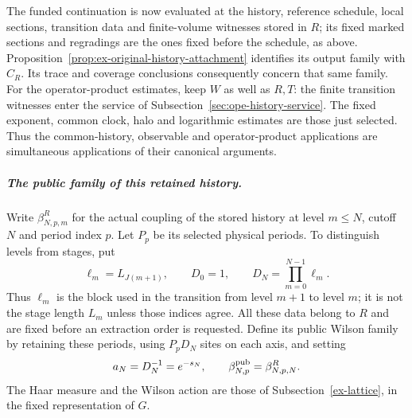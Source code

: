 The funded continuation is now evaluated at the history, reference
schedule, local sections, transition data and finite-volume witnesses
stored in $R$; its fixed marked sections and regradings are the ones fixed
before the schedule, as above. Proposition~\ref{prop:ex-original-history-attachment}
identifies its output family with $C_R$. Its trace and coverage
conclusions consequently concern that same family. For the
operator-product estimates, keep $W$ as well as $R,T$: the finite
transition witnesses enter the service of
Subsection~\ref{sec:ope-history-service}. The fixed exponent, common
clock, halo and logarithmic estimates are those just selected.
Thus the common-history, observable and operator-product applications
are simultaneous applications of their canonical arguments.

\subparagraph{The public family of this retained history.}
Write $\beta^R_{N,p,m}$ for the actual coupling of the stored history at
level $m\le N$, cutoff $N$ and period index $p$. Let $P_p$ be its selected
physical periods. To distinguish levels from stages, put
\[
 \ell_m=L_{J(m+1)},\qquad D_0=1,\qquad
 D_N=\prod_{m=0}^{N-1}\ell_m.
\]
Thus $\ell_m$ is the block used in the transition from level $m+1$ to
level $m$; it is not the stage length $L_m$ unless those indices agree.
All these data belong to $R$ and are fixed before an extraction order is
requested. Define its public Wilson family by retaining these periods,
using $P_pD_N$ sites on each axis, and setting
\begin{equation}\label{eq:public-family-coordinates}
 a_N=D_N^{-1}=e^{-s_N},\qquad
 \beta^{\rm pub}_{N,p}=\beta^R_{N,p,N}.
\end{equation}
The Haar measure and the Wilson action are those of
Subsection~\ref{ex-lattice}, in the fixed representation of $G$.

